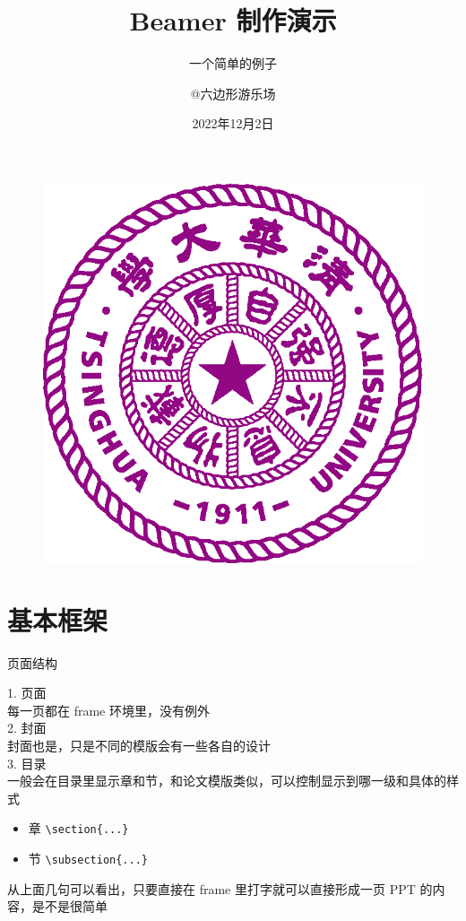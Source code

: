 \documentclass[AutoFakeBold,AutoFakeSlant]{beamer}
\author{@六边形游乐场}
\title{Beamer 制作演示}
\subtitle{一个简单的例子}
\institute{六边形宇宙驻B站办事处}
\date{2022年12月2日}
\begin{document}
\kaishu
\begin{frame}
    \titlepage
    \begin{figure}[htpb]
        \begin{center}
            \includegraphics[width=0.2\linewidth]{pic/Tsinghua_University_Logo.eps}
        \end{center}
    \end{figure}
\end{frame}

\begin{frame}
\tableofcontents[sectionstyle=show,subsectionstyle=show/shaded/hide,subsubsectionstyle=show/shaded/hide]
\end{frame}


\section{基本框架}
\begin{frame}[fragile]{页面结构}

1. 页面\\
每一页都在 frame 环境里，没有例外\\
\vspace{1em}
2. 封面\\
封面也是，只是不同的模版会有一些各自的设计\\
\vspace{1em}
3. 目录\\
一般会在目录里显示章和节，和论文模版类似，可以控制显示到哪一级和具体的样式
\begin{itemize}
    \item 章 \verb|\section{...}|
    \item 节 \verb|\subsection{...}|
\end{itemize}
\vspace{1em}
从上面几句可以看出，只要直接在 frame 里打字就可以直接形成一页 PPT 的内容，是不是很简单\\

\end{frame}
\end{document}
